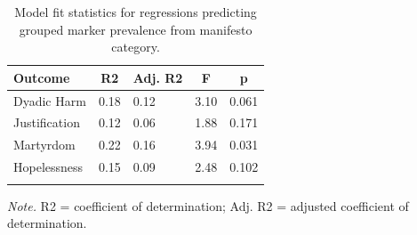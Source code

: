 \documentclass[
  english,
  man,floatsintext]{apa6}
\begin{document}
\begin{table}[H]

\begin{center}
\begin{threeparttable}

\caption{\label{tab:manifesto-model-fit}Model fit statistics for regressions predicting grouped marker prevalence from manifesto category.}

\begin{tabular}{lllll}
\toprule
Outcome & \multicolumn{1}{c}{R2} & \multicolumn{1}{c}{Adj. R2} & \multicolumn{1}{c}{F} & \multicolumn{1}{c}{p}\\
\midrule
Dyadic Harm & 0.18 & 0.12 & 3.10 & 0.061\\
Justification & 0.12 & 0.06 & 1.88 & 0.171\\
Martyrdom & 0.22 & 0.16 & 3.94 & 0.031\\
Hopelessness & 0.15 & 0.09 & 2.48 & 0.102\\
\bottomrule
\addlinespace
\end{tabular}

\begin{tablenotes}[para]
\normalsize{\textit{Note.} R2 = coefficient of determination; Adj. R2 = adjusted coefficient of determination.}
\end{tablenotes}

\end{threeparttable}
\end{center}

\end{table}
\end{document}

